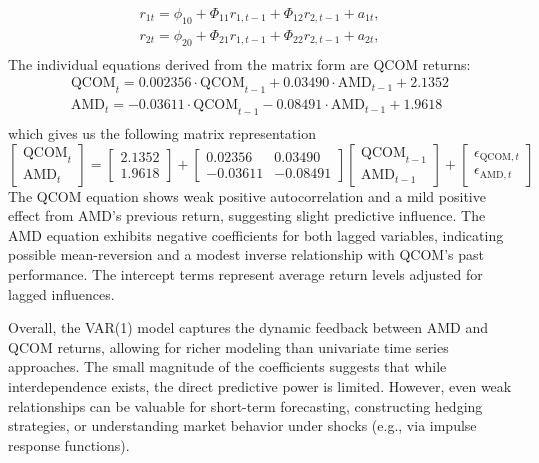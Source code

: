 \begin{equation}
	\begin{aligned}
		r_{1t}=\phi_{10}+\Phi_{11}r_{1,t-1}+\Phi_{12}r_{2,t-1}+a_{1t},\\
		r_{2t}=\phi_{20}+\Phi_{21}r_{1,t-1}+\Phi_{22}r_{2,t-1}+a_{2t},\\
	\end{aligned}
\end{equation}
The individual equations derived from the matrix form are QCOM returns:
\begin{equation}
	\begin{aligned}
		\text{QCOM}_t=0.002356\cdot\text{QCOM}_{t-1}+0.03490\cdot\text{AMD}_{t-1}+2.1352\\
		\text{AMD}_t=-0.03611\cdot\text{QCOM}_{t-1}-0.08491\cdot\text{AMD}_{t-1}+1.9618\\
	\end{aligned}
\end{equation}
which gives us the following matrix representation
\begin{equation}
	\begin{bmatrix}
		\text{QCOM}_t \\
		\text{AMD}_t
	\end{bmatrix}
	=
	\begin{bmatrix}
		2.1352 \\
		1.9618
	\end{bmatrix}
	+
	\begin{bmatrix}
		0.02356 & 0.03490 \\
		-0.03611 & -0.08491
	\end{bmatrix}
	\begin{bmatrix}
		\text{QCOM}_{t-1} \\
		\text{AMD}_{t-1}
	\end{bmatrix}
	+
	\begin{bmatrix}
		\epsilon_{\text{QCOM},t} \\
		\epsilon_{\text{AMD},t}
	\end{bmatrix}
\end{equation}
The QCOM equation shows weak positive autocorrelation and a mild positive effect from AMD’s previous return, suggesting slight predictive influence. The AMD equation exhibits negative coefficients for both lagged variables, indicating possible mean-reversion and a modest inverse relationship with QCOM’s past performance. The intercept terms represent average return levels adjusted for lagged influences.

Overall, the VAR(1) model captures the dynamic feedback between AMD and QCOM returns, allowing for richer modeling than univariate time series approaches. The small magnitude of the coefficients suggests that while interdependence exists, the direct predictive power is limited. However, even weak relationships can be valuable for short-term forecasting, constructing hedging strategies, or understanding market behavior under shocks (e.g., via impulse response functions). 

